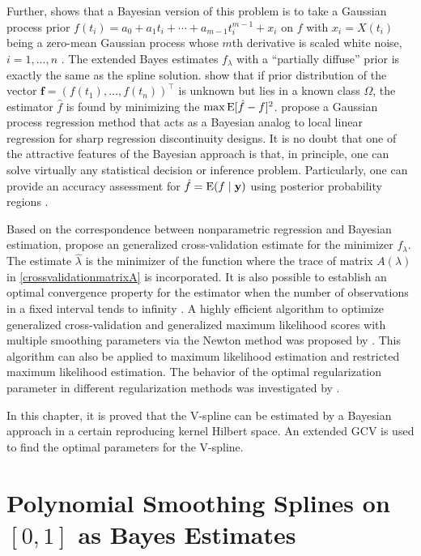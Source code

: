 Further, \cite{wahba1978improper} shows that a Bayesian version of this problem is to take a Gaussian process prior $f(t_i) = a_0+a_1t_i+\cdots + a_{m-1}t_i^{m-1} + x_i$ on $f$ with $x_i=X(t_i)$ being a zero-mean Gaussian process whose $m$th derivative is scaled white noise, $i=1,\ldots,n$ \citep{speckman2003fully}. The extended Bayes estimates $f_\lambda$ with a ``partially diffuse'' prior is exactly the same as the spline solution. \cite{heckman1991minimax} show that if prior distribution of the vector  $\mathbf{f}=(f(t_1),\ldots,f(t_n))^\top$ is unknown but lies in a known class $\Omega$,
the estimator $\hat{f}$ is found by minimizing the $\max\mathrm{E}\lbrack \hat{f}-f\rbrack^2$. \cite{branson2017nonparametric} propose a Gaussian process regression method that acts as a Bayesian analog to local linear regression for sharp regression discontinuity designs. It is no doubt that one of the attractive features of the Bayesian approach is that, in principle, one can solve virtually any statistical decision or inference problem. Particularly, one can provide an accuracy assessment for $\hat{f}=\mathrm{E} (f\mid \mathbf{y})$ using posterior probability regions \citep{cox1993analysis}. 


Based on the correspondence between nonparametric regression and Bayesian estimation, \cite{craven1978smoothing} propose an generalized cross-validation estimate for the minimizer $f_\lambda$. The estimate $\hat{\lambda}$ is the minimizer of the function where the trace of matrix $A(\lambda)$ in \eqref{crossvalidationmatrixA} is incorporated. It is also possible to establish an optimal convergence property for the estimator when the number of observations in a fixed interval tends to infinity \citep{wecker1983signal}. A highly efficient algorithm to optimize generalized cross-validation and generalized maximum likelihood scores with multiple smoothing parameters via the Newton method was proposed by \cite{gu1991minimizing}. This algorithm can also be applied to maximum likelihood estimation and restricted maximum likelihood estimation. The behavior of the optimal regularization parameter in different regularization methods was investigated by \cite{wahba1990optimal}. 


In this chapter, it is proved that the V-spline can be estimated by a Bayesian approach in a certain reproducing kernel Hilbert space. An extended GCV is used to find the optimal parameters for the V-spline. 



\section{Polynomial Smoothing Splines on $[0, 1]$ as Bayes Estimates}

